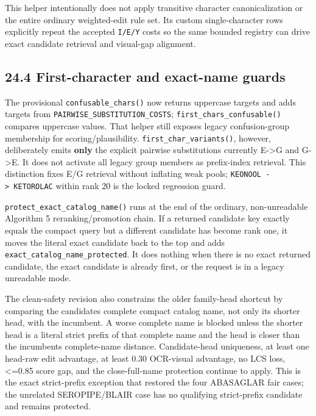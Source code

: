 This helper intentionally does not apply transitive character canonicalization or the entire ordinary weighted-edit rule set. Its custom single-character rows explicitly repeat the accepted \texttt{I/E/Y} costs so the same bounded registry can drive exact candidate retrieval and visual-gap alignment.

\subsection{24.4 First-character and exact-name guards}\label{244-first-character-and-exact-name-guards}

The provisional \texttt{confusable\_\allowbreak{}chars()} now returns uppercase targets and adds targets from \texttt{PAIRWISE\_\allowbreak{}SUBSTITUTION\_\allowbreak{}COSTS}; \texttt{first\_\allowbreak{}chars\_\allowbreak{}confusable()} compares uppercase values. That helper still exposes legacy confusion-group membership for scoring/plausibility. \texttt{first\_\allowbreak{}char\_\allowbreak{}variants()}, however, deliberately emits \textbf{only} the explicit pairwise substitutions currently E-\textgreater G and G-\textgreater E. It does not activate all legacy group members as prefix-index retrieval. This distinction fixes E/G retrieval without inflating weak pools; \texttt{KEONOOL\ -\textgreater{}\ KETOROLAC} within rank 20 is the locked regression guard.

\texttt{protect\_\allowbreak{}exact\_\allowbreak{}catalog\_\allowbreak{}name()} runs at the end of the ordinary, non-unreadable Algorithm 5 reranking/promotion chain. If a returned candidate key exactly equals the compact query but a different candidate has become rank one, it moves the literal exact candidate back to the top and adds \texttt{exact\_\allowbreak{}catalog\_\allowbreak{}name\_\allowbreak{}protected}. It does nothing when there is no exact returned candidate, the exact candidate is already first, or the request is in a legacy unreadable mode.

The clean-safety revision also constrains the older family-head shortcut by comparing the candidate\textquotesingle s complete compact catalog name, not only its shorter head, with the incumbent. A worse complete name is blocked unless the shorter head is a literal strict prefix of that complete name and the head is closer than the incumbent\textquotesingle s complete-name distance. Candidate-head uniqueness, at least one head-raw edit advantage, at least 0.30 OCR-visual advantage, no LCS loss, \textless=0.85 score gap, and the close-full-name protection continue to apply. This is the exact strict-prefix exception that restored the four ABASAGLAR fair cases; the unrelated SEROPIPE/BLAIR case has no qualifying strict-prefix candidate and remains protected.

